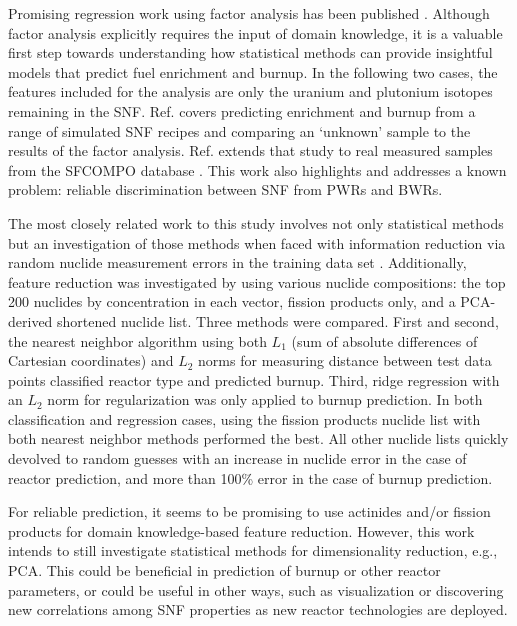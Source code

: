 Promising regression work using factor analysis has been published
\cite{nicolaou_2006, nicolaou_2014}.  Although factor analysis explicitly
requires the input of domain knowledge, it is a valuable first step towards
understanding how statistical methods can provide insightful models that
predict fuel enrichment and burnup. In the following two cases, the features
included for the analysis are only the uranium and plutonium isotopes remaining
in the \gls{SNF}.  Ref. \cite{nicolaou_2006} covers predicting enrichment and
burnup from a range of simulated \gls{SNF} recipes and comparing an `unknown'
sample to the results of the factor analysis. Ref.  \cite{nicolaou_2014}
extends that study to real measured samples from the \gls{SFCOMPO} database
\cite{sfcompo}. This work also highlights and addresses a known problem:
reliable discrimination between \gls{SNF} from \glspl{PWR} and 
\glspl{BWR}. 

The most closely related work to this study involves not only statistical
methods but an investigation of those methods when faced with information
reduction via random nuclide measurement errors in the training data set
\cite{dayman_feasibility_2013}.  Additionally, feature reduction was
investigated by using various nuclide compositions: the top 200 nuclides by
concentration in each vector, fission products only, and a \gls{PCA}-derived
shortened nuclide list.  Three methods were compared. First and second, the
nearest neighbor algorithm using both $L_1$ (sum of absolute differences of
Cartesian coordinates) and $L_2$ norms for measuring distance between test data
points classified reactor type and predicted burnup.  Third, ridge regression
with an $L_2$ norm for regularization was only applied to burnup prediction. In
both classification and regression cases, using the fission products nuclide
list with both nearest neighbor methods performed the best. All other nuclide
lists quickly devolved to random guesses with an increase in nuclide error in
the case of reactor prediction, and more than 100\% error in the case of burnup
prediction.

For reliable prediction, it seems to be promising to use actinides
\cite{nicolaou_2006, nicolaou_2014} and/or fission products
\cite{dayman_feasibility_2013} for domain knowledge-based feature reduction.
However, this work intends to still investigate statistical methods for
dimensionality reduction, e.g., \gls{PCA}. This could be beneficial in
prediction of burnup or other reactor parameters, or could be useful in other
ways, such as visualization or discovering new correlations among \gls{SNF}
properties as new reactor technologies are deployed.

